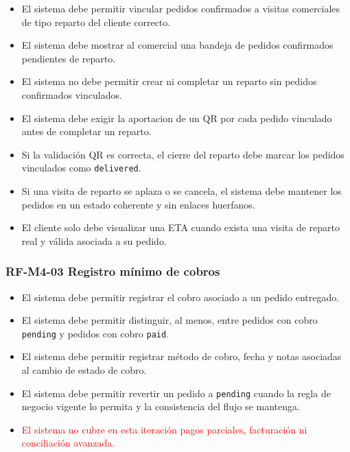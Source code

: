 \begin{itemize}
    \item El sistema debe permitir vincular pedidos confirmados a visitas comerciales de tipo reparto del cliente correcto.
    \item El sistema debe mostrar al comercial una bandeja de pedidos confirmados pendientes de reparto.
    \item El sistema no debe permitir crear ni completar un reparto sin pedidos confirmados vinculados.
    \item El sistema debe exigir la aportacion de un QR por cada pedido vinculado antes de completar un reparto.
    \item Si la validación QR es correcta, el cierre del reparto debe marcar los pedidos vinculados como \texttt{delivered}.
    \item Si una visita de reparto se aplaza o se cancela, el sistema debe mantener los pedidos en un estado coherente y sin enlaces huerfanos.
    \item El cliente solo debe visualizar una ETA cuando exista una visita de reparto real y válida asociada a su pedido.
\end{itemize}

\vspace{-0.75em}
\subsubsection{RF-M4-03 Registro mínimo de cobros}
\vspace{-1em}

\begin{itemize}
    \item El sistema debe permitir registrar el cobro asociado a un pedido entregado.
    \item El sistema debe permitir distinguir, al menos, entre pedidos con cobro \texttt{pending} y pedidos con cobro \texttt{paid}.
    \item El sistema debe permitir registrar método de cobro, fecha y notas asociadas al cambio de estado de cobro.
    \item El sistema debe permitir revertir un pedido a \texttt{pending} cuando la regla de negocio vigente lo permita y la consistencia del flujo se mantenga.
    \item \textcolor{red}{El sistema no cubre en esta iteración pagos parciales, facturación ni conciliación avanzada.}
\end{itemize}

\vspace{-0.75em}

